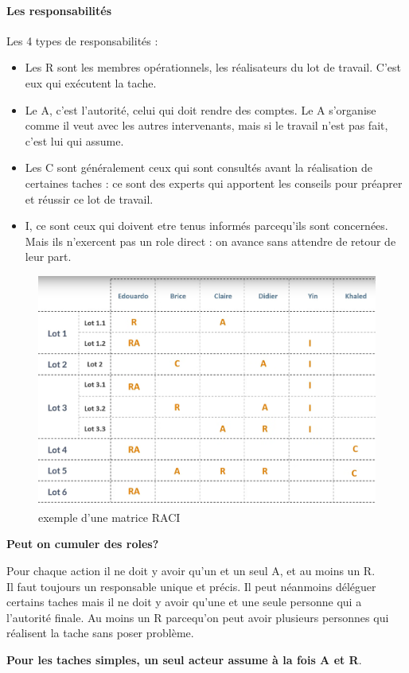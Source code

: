 \paragraph*{Les responsabilités}
Les 4 types de responsabilités :
\begin{itemize}
	\item Les R sont les membres opérationnels, les réalisateurs du lot de travail. C'est eux qui exécutent la tache.
	\item Le A, c'est l'autorité, celui qui doit rendre des comptes. Le A s'organise comme il veut avec les autres intervenants, mais si le travail n'est pas fait, c'est lui qui assume.
	\item Les C sont généralement ceux qui sont consultés avant la réalisation de certaines taches : ce sont des experts qui apportent les conseils pour préaprer et réussir ce lot de travail.
	\item I, ce sont ceux qui doivent etre tenus informés parcequ'ils sont concernées. Mais ils n'exercent pas un role direct : on avance sans attendre de retour de leur part.
\end{itemize}
\begin{figure}[!h]
	\begin{center}
		\includegraphics[scale=0.2]{images/exemple_matrice_raci.png}
		\caption{exemple d'une matrice RACI}
	\end{center}
\end{figure}
\textbf{Peut on cumuler des roles?}\\
\begin{danger}
	Pour chaque action il ne doit y avoir qu'un et un seul A, et au moins un R.\\
	Il faut toujours un responsable unique et précis. Il peut néanmoins déléguer certains taches mais il ne doit y avoir qu'une et une seule personne qui a l'autorité finale. Au moins un R parcequ'on peut avoir plusieurs personnes qui réalisent la tache sans poser problème.
	
	\textbf{Pour les taches simples, un seul acteur assume à la fois A et R}.
\end{danger}
